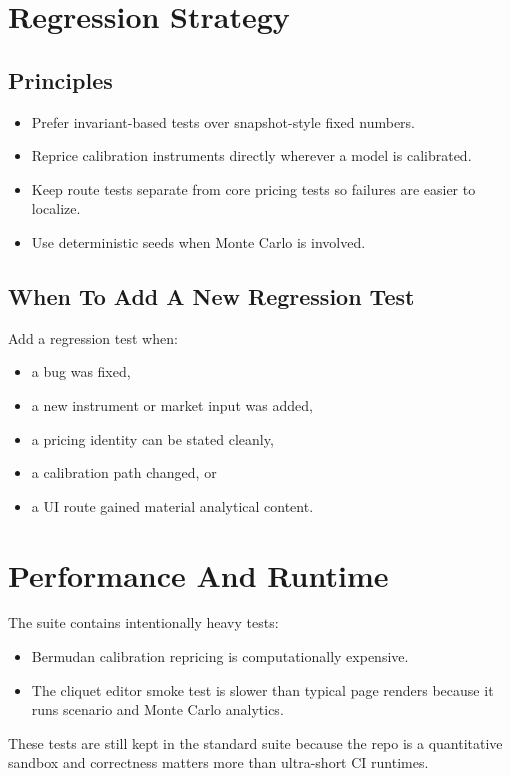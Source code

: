 \documentclass[conference]{IEEEtran}
\begin{document}
\section{Regression Strategy}
\subsection{Principles}
\begin{itemize}[leftmargin=1.5em]
    \item Prefer invariant-based tests over snapshot-style fixed numbers.
    \item Reprice calibration instruments directly wherever a model is calibrated.
    \item Keep route tests separate from core pricing tests so failures are easier to localize.
    \item Use deterministic seeds when Monte Carlo is involved.
\end{itemize}

\subsection{When To Add A New Regression Test}
Add a regression test when:
\begin{itemize}[leftmargin=1.5em]
    \item a bug was fixed,
    \item a new instrument or market input was added,
    \item a pricing identity can be stated cleanly,
    \item a calibration path changed, or
    \item a UI route gained material analytical content.
\end{itemize}

\section{Performance And Runtime}
The suite contains intentionally heavy tests:
\begin{itemize}[leftmargin=1.5em]
    \item Bermudan calibration repricing is computationally expensive.
    \item The cliquet editor smoke test is slower than typical page renders because it runs scenario and Monte Carlo analytics.
\end{itemize}
These tests are still kept in the standard suite because the repo is a quantitative sandbox and correctness matters more than ultra-short CI runtimes.
\end{document}
